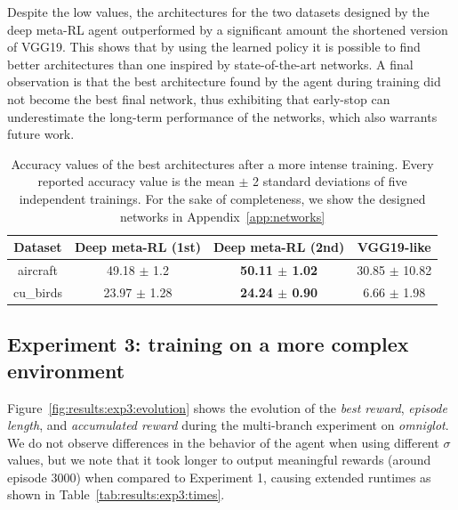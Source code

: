 Despite the low values, the architectures for the two datasets designed by the deep meta-RL agent outperformed by a significant amount the shortened version of VGG19. This shows that by using the learned policy it is possible to find better architectures than one inspired by state-of-the-art networks. A final observation is that the best architecture found by the agent during training did not become the best final network, thus exhibiting that early-stop can underestimate the long-term performance of the networks, which also warrants future work. 

\begin{table}[ht]
\centering
\begin{tabular}{@{}cccc@{}}
\toprule
Dataset   & Deep meta-RL (1st) & Deep meta-RL (2nd)          & VGG19-like                   \\ \midrule
aircraft  & 49.18 $\pm$ 1.2  & \textbf{50.11 $\pm$ 1.02} & 30.85 $\pm$ 10.82 \\
cu\_birds & 23.97 $\pm$ 1.28 & \textbf{24.24 $\pm$ 0.90} & 6.66 $\pm$ 1.98             \\ \bottomrule
\end{tabular}
\caption{Accuracy values of the best architectures after a more intense training. Every reported accuracy value is the mean $\pm$ 2 standard deviations of five independent trainings. For the sake of completeness, we show the designed networks in Appendix~\ref{app:networks}}
\label{tab:results:exp2:acc}
\end{table}

\subsection*{Experiment 3: training on a more complex environment}

Figure~\ref{fig:results:exp3:evolution} shows the evolution of the \textit{best reward}, \textit{episode length}, and \textit{accumulated reward} during the multi-branch experiment on \textit{omniglot}. We do not observe differences in the behavior of the agent when using different $\sigma$ values, but we note that it took longer to output meaningful rewards (around episode 3000) when compared to Experiment 1, causing extended runtimes as shown in Table~\ref{tab:results:exp3:times}.

